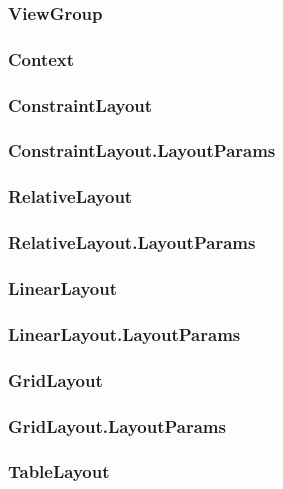 \documentclass{report}
\begin{document}
\begin{itemize}
    \pagebreak 
    \subsubsection{ViewGroup}

    \pagebreak 
    \subsubsection{Context}

    \pagebreak 
    \subsubsection{ConstraintLayout}

    \pagebreak 
    \subsubsection{ConstraintLayout.LayoutParams}

    \pagebreak 
    \subsubsection{RelativeLayout}

    \pagebreak 
    \subsubsection{RelativeLayout.LayoutParams}

    \pagebreak 
    \subsubsection{LinearLayout}

    \pagebreak 
    \subsubsection{LinearLayout.LayoutParams}

    \pagebreak 
    \subsubsection{GridLayout}

    \pagebreak 
    \subsubsection{GridLayout.LayoutParams}

    \pagebreak 
    \subsubsection{TableLayout}


\end{itemize}
\end{document}
